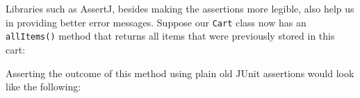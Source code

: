 \begin{Shaded}
\begin{Highlighting}[]
 \NormalTok{() \{}
\NormalTok{(}\NormalTok{);}
\NormalTok{(}\NormalTok{);}

    \NormalTok{(}\NormalTok{());}
\NormalTok{\}}
\end{Highlighting}
\end{Shaded}

Libraries such as AssertJ, besides making the assertions more legible,
also help us in providing better error messages. Suppose our
\texttt{Cart} class now has an \texttt{allItems()} method that returns
all items that were previously stored in this cart:

\begin{Shaded}
\begin{Highlighting}[]
 \NormalTok{\textless{}}\NormalTok{\textgreater{} }\NormalTok{() \{}
     
\NormalTok{\}}
\end{Highlighting}
\end{Shaded}

Asserting the outcome of this method using plain old JUnit assertions
would look like the following:

\begin{Shaded}
\begin{Highlighting}[]
 \NormalTok{() \{}
\NormalTok{(}\NormalTok{);}
\NormalTok{(}\NormalTok{);}

\NormalTok{();}

    \NormalTok{(}\NormalTok{));}
    \NormalTok{(}\NormalTok{));}
\NormalTok{\}}
\end{Highlighting}
\end{Shaded}

